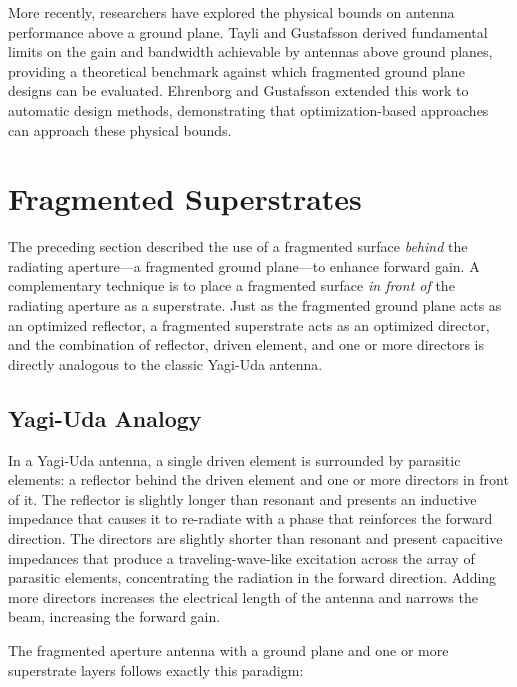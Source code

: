 More recently, researchers have explored the physical bounds on antenna performance above a ground plane.  Tayli and Gustafsson \cite{Tayli2016PhysicalBounds} derived fundamental limits on the gain and bandwidth achievable by antennas above ground planes, providing a theoretical benchmark against which fragmented ground plane designs can be evaluated.  Ehrenborg and Gustafsson \cite{Ehrenborg2016PhysicalBounds} extended this work to automatic design methods, demonstrating that optimization-based approaches can approach these physical bounds.

\section{Fragmented Superstrates}
\label{sec:ch4superstrate}

The preceding section described the use of a fragmented surface \emph{behind} the radiating aperture---a fragmented ground plane---to enhance forward gain.  A complementary technique is to place a fragmented surface \emph{in front of} the radiating aperture as a superstrate.  Just as the fragmented ground plane acts as an optimized reflector, a fragmented superstrate acts as an optimized director, and the combination of reflector, driven element, and one or more directors is directly analogous to the classic Yagi-Uda antenna.

\subsection{Yagi-Uda Analogy}

In a Yagi-Uda antenna, a single driven element is surrounded by parasitic elements: a reflector behind the driven element and one or more directors in front of it.  The reflector is slightly longer than resonant and presents an inductive impedance that causes it to re-radiate with a phase that reinforces the forward direction.  The directors are slightly shorter than resonant and present capacitive impedances that produce a traveling-wave-like excitation across the array of parasitic elements, concentrating the radiation in the forward direction.  Adding more directors increases the electrical length of the antenna and narrows the beam, increasing the forward gain.

The fragmented aperture antenna with a ground plane and one or more superstrate layers follows exactly this paradigm:

